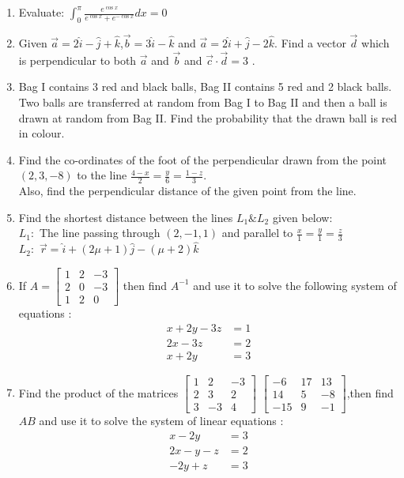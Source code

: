 \documentclass{article}
\providecommand{\myvec}[1]{\ensuremath{\begin{bmatrix}#1 \end{bmatrix}}}
\begin{document}
\begin{enumerate}
\item Evaluate: $\int_{0}^{\pi}\frac{e^{\cos{x}}}{e^{\cos{x}} + e^{-\cos{x}}}dx = 0$

\item Given $\vec{a}=2\hat{i}-\hat{j}+\hat{k}$,$\vec{b}=3\hat{i}-\hat{k}$ and $\vec{a}=2\hat{i}+\hat{j}-2\hat{k}$. Find a vector $\vec{d}$ which is perpendicular to both $\vec{a}$ and $\vec{b}$ and $\vec{c}\cdot\vec{d}=3$ .

\item Bag I contains 3 red and black balls, Bag II contains 5 red and 2 black balls. Two balls are transferred at random from Bag I to Bag II and then a ball is drawn at random from Bag II. Find the probability that the drawn ball is red in colour.


\item Find the co-ordinates of the foot of the perpendicular drawn from the point $(2,3,-8)$ to the line $\frac{4-x}{2} = \frac{y}{6} = \frac{1-z}{3}$.\\
Also, find the perpendicular distance of the given point from the line.

\item Find the shortest distance between the lines $L_{1} \& L_{2}$ given below:\\
	$L_{1}:$ The line passing through $(2,-1,1)$  and parallel to $ \frac{x}{1} = \frac{y}{1}=\frac{z}{3}$\\
		$L_{2}:$  $\vec{r}= \hat{i}+(2\mu + 1)\hat{j}-(\mu + 2)\hat{k}$


\item If $A=\myvec{ 1 & 2 & -3\\2 & 0 & -3\\1 & 2 & 0}$ then find $A^{-1}$ and use it to solve the following system of equations :
	\begin{align*}  x + 2y -3z&= 1\\
		2x-3z & =2\\
                x+ 2y &=3 \end{align*}

\item Find the product of the matrices $\myvec{ 1 & 2 & -3\\2 & 3 & 2\\3 & -3 & 4}$ $\myvec{  -6 & 17 & 13\\14 & 5 & -8\\-15 & 9 & -1}$,then find $AB$ and use it to solve the system of linear equations :
\begin{align} x - 2y &= 3\\2x - y - z &= 2\\-2y + z &= 3\end{align}



\end{enumerate}
\end{document}

